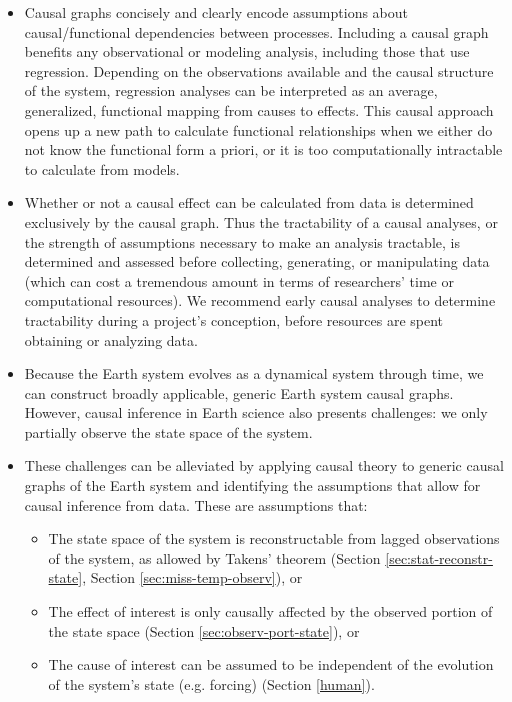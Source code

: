 \documentclass[12pt]{article}
\begin{document}
\begin{itemize}
\item Causal graphs concisely and clearly encode assumptions about
  causal/functional dependencies between processes. Including a causal
  graph benefits any observational or modeling analysis, including those
  that use regression. Depending on the observations available and the
  causal structure of the system, regression analyses can be interpreted
  as an average, generalized, functional mapping from causes to
  effects. This causal approach opens up a new path to calculate
  functional relationships when we either do not know the functional
  form a priori, or it is too computationally intractable to calculate
  from models.
\item Whether or not a causal effect can be calculated from data is
  determined exclusively by the causal graph. Thus the tractability of a
  causal analyses, or the strength of assumptions necessary to make an
  analysis tractable, is determined and assessed before collecting,
  generating, or manipulating data (which can cost a tremendous amount
  in terms of researchers' time or computational resources). We
  recommend early causal analyses to determine tractability during a
  project's conception, before resources are spent obtaining or
  analyzing data.
\item Because the Earth system evolves as a dynamical system through
  time, we can construct broadly applicable, generic Earth system
  causal graphs. However, causal inference in Earth science also
  presents challenges: we only partially observe the state space of
  the system.
\item These challenges can be alleviated by applying causal theory to
  generic causal graphs of the Earth system and identifying the
  assumptions that allow for causal inference from data. These are
  assumptions that:
  \begin{itemize}
  \item The state space of the system is reconstructable from lagged
    observations of the system, as allowed by Takens' theorem (Section
    \ref{sec:stat-reconstr-state}, Section \ref{sec:miss-temp-observ}), or
  \item The effect of interest is only causally affected by the
    observed portion of the state space (Section
    \ref{sec:observ-port-state}), or
  \item The cause of interest can be assumed to be independent of the
    evolution of the system's state (e.g. forcing) (Section \ref{human}).
  \end{itemize}
\end{itemize}
\end{document}
